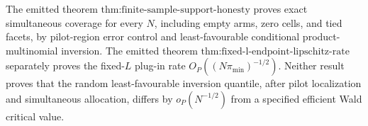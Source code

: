 The emitted theorem \(\text{thm:finite-sample-support-honesty}\) proves exact simultaneous coverage for every \(N\), including empty arms, zero cells, and tied facets, by pilot-region error control and least-favourable conditional product-multinomial inversion.  The emitted theorem \(\text{thm:fixed-l-endpoint-lipschitz-rate}\) separately proves the fixed-\(L\) plug-in rate \(O_P((N\pi_{\min})^{-1/2})\).  Neither result proves that the random least-favourable inversion quantile, after pilot localization and simultaneous allocation, differs by \(o_P(N^{-1/2})\) from a specified efficient Wald critical value.
